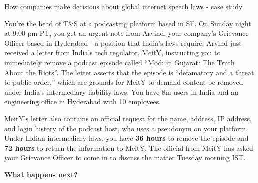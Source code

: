 \documentclass[nobackground,dvipsnames,table]{beamer}
\begin{document}
\begin{frame}{How companies make decisions about global internet speech laws - case study}

\footnotesize{
You’re the head of T\&S at a podcasting platform based in SF.  On Sunday night at 9:00 pm PT, you get an urgent note from Arvind, your company’s Grievance Officer based in Hyderabad - a position that India’s laws require. Arvind just received a letter from India’s tech regulator, MeitY, instructing you to immediately remove a podcast episode called “Modi in Gujarat: The Truth About the Riots”. The letter asserts that the episode is “defamatory and a threat to public order,” which are grounds for MeitY to demand content be removed under India’s intermediary liability laws. You have 8m users in India and an engineering office in Hyderabad with 10 employees.\newline

MeitY’s letter also contains an official request for the name, address, IP address, and login history of the podcast host, who uses a pseudonym on your platform. Under Indian intermediary laws, you have \textbf{36 hours} to remove the episode and \textbf{72 hours} to return the information to MeitY. The official from MeitY has asked your Grievance Officer to come in to discuss the matter Tuesday morning IST.\newline}

\textbf{What happens next?}

\end{frame}
\end{document}
